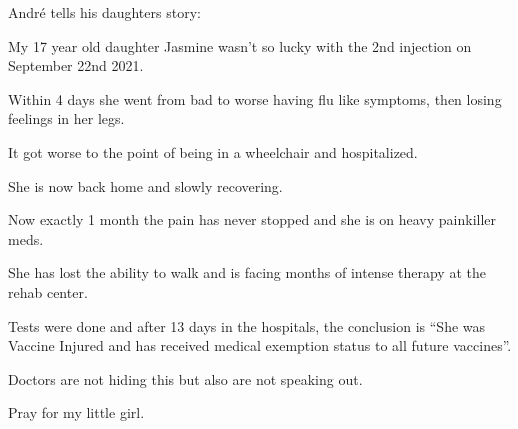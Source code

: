 André tells his daughters story:

My 17 year old daughter Jasmine wasn’t so lucky with the 2nd injection on
September 22nd 2021.

Within 4 days she went from bad to worse having flu like symptoms, then losing
feelings in her legs.

It got worse to the point of being in a wheelchair and hospitalized.

She is now back home and slowly recovering.

Now exactly 1 month the pain has never stopped and she is on heavy painkiller
meds.

She has lost the ability to walk and is facing months of intense therapy at the
rehab center.

Tests were done and after 13 days in the hospitals, the conclusion is “She was
Vaccine Injured and has received medical exemption status to all future
vaccines”.

Doctors are not hiding this but also are not speaking out.

Pray for my little girl.

